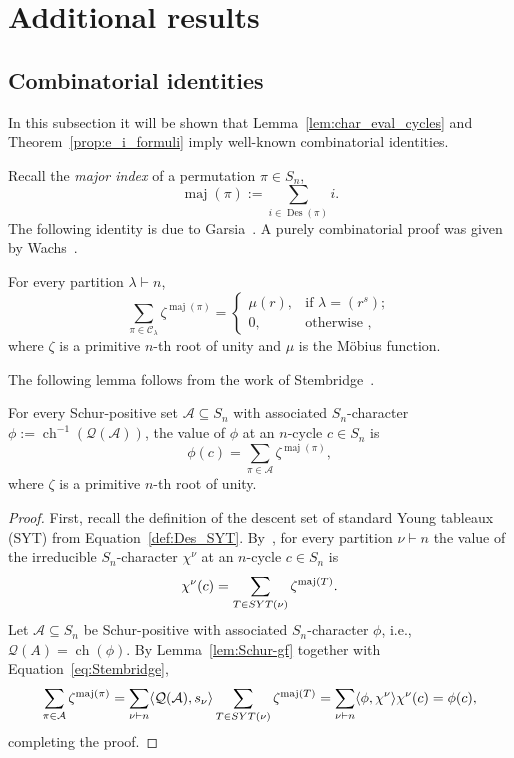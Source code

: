 \documentclass[ALCO,published]{cedram}
\newcommand{\Q}{\mathcal Q}
\newcommand{\C}{\mathcal C}
\newcommand{\A}{\mathcal A}
\DeclareMathOperator\Des{Des}
\DeclareMathOperator\maj{maj}
\newcommand{\ch}{{\operatorname{ch}}}
\def\SYT{{\rm SYT}}
\begin{document}
\section{Additional results}
\label{sec:final}

\subsection{Combinatorial identities}
\label{remarks_on_s=1}

In this subsection it will be shown that Lemma~\ref{lem:char_eval_cycles} and Theorem~\ref{prop:e_i_formuli} imply well-known combinatorial identities.

Recall the {\em major index} of a permutation $\pi \in S_n$,
\[
    \maj(\pi):=\sum\limits_{i\in \Des(\pi)}i.
\]
The following identity is due to 
Garsia~\cite{Garsia}. A purely combinatorial proof was given by Wachs~\cite{Wachs}.

\begin{proposition}\label{prop:Garsia}
     For every partition $\lambda\vdash n$,
    \[
        \sum_{\pi \in \C_\lambda} \zeta^{\maj(\pi)}
        = \begin{cases} 
            \mu(r), &\text{if } \lambda = (r^s); \\
    		0, &\text{otherwise },
		\end{cases}
    \]
    where $\zeta$ is a primitive $n$-th root of unity and $\mu$ is the M\"obius function. 
\end{proposition}

The following lemma follows from the work of Stembridge~\cite{Stembridge}.

\begin{lemma}\label{prop:equiv_Garsia}
    For every Schur-positive set $\A\subseteq S_n$ with associated $S_n$-character $\phi := \ch^{-1}(\Q(\A))$, the value of $\phi$ at an $n$-cycle $c\in S_n$ is
    \[
        \phi(c) = \sum_{\pi \in \A} \zeta^{\maj(\pi)},
    \]
    where $\zeta$ is a primitive $n$-th root of unity. 
\end{lemma}

\begin{proof}
    First, recall 
    the definition of the descent set of standard Young tableaux (SYT) 
    from Equation~\eqref{def:Des_SYT}. By~\cite[Lemma 3.4]{Stembridge}, for every partition $\nu\vdash n$ the value of the irreducible $S_n$-character $\chi^\nu$ at an $n$-cycle $c\in S_n$ is 
    \begin{equation}\label{eq:Stembridge}
        \chi^\nu(c)=\sum\limits_{T\in \SYT(\nu)}\zeta^{\maj(T)}.
    \end{equation}
    Let $\A\subseteq S_n$ be Schur-positive with associated $S_n$-character $\phi$, i.e., 
    $\Q(A)=\ch (\phi)$. 
    By Lemma~\ref{lem:Schur-gf} 
    together with Equation~\eqref{eq:Stembridge},
    \[
        \sum_{\pi \in \A} \zeta^{\maj(\pi)}
        = \sum_{\nu \vdash n} \langle \Q(\A), s_\nu \rangle \sum_{T \in \SYT(\nu)} \zeta^{\maj(T)}
        = \sum_{\nu \vdash n} \langle \phi, \chi^\nu \rangle \chi^\nu(c)
        = \phi(c), 
    \]
    completing the proof.
\end{proof}
\end{document}
